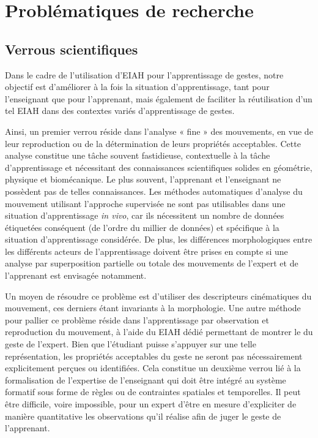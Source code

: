 \section{Problématiques de recherche}
\subsection{Verrous scientifiques}
Dans le cadre de l'utilisation d'EIAH pour l'apprentissage de gestes, notre objectif est d'améliorer à la fois la situation d'apprentissage, tant pour l'enseignant que pour l'apprenant, mais également de faciliter la réutilisation d'un tel EIAH dans des contextes variés d'apprentissage de gestes.

Ainsi, un premier verrou réside dans l'analyse « fine »  des mouvements, en vue de leur reproduction ou de la détermination de leurs propriétés acceptables. Cette analyse constitue une tâche souvent fastidieuse, contextuelle à la tâche d'apprentissage et nécessitant des connaissances scientifiques solides en géométrie, physique et biomécanique. Le plus souvent, l'apprenant et l'enseignant ne possèdent pas de telles connaissances. Les méthodes automatiques d'analyse du mouvement utilisant l'approche supervisée ne sont pas utilisables dans une situation d'apprentissage \textit{in vivo}, car ils nécessitent un nombre de données étiquetées conséquent (de l'ordre du millier de données) et spécifique à la situation d'apprentissage considérée. De plus, les différences morphologiques entre les différents acteurs de l'apprentissage doivent être prises en compte si une analyse par superposition partielle ou totale des mouvements de l'expert et de l'apprenant est envisagée notamment.

Un moyen de résoudre ce problème est d'utiliser des descripteurs cinématiques du mouvement, ces derniers étant invariants à la morphologie. Une autre méthode pour pallier ce problème réside dans l'apprentissage par observation et reproduction du mouvement, à l'aide du EIAH dédié permettant de montrer le du geste de l'expert. Bien que l'étudiant puisse s'appuyer sur une telle représentation, les propriétés acceptables du geste ne seront pas nécessairement explicitement perçues ou identifiées. Cela constitue un deuxième verrou lié à la formalisation de l'expertise de l'enseignant qui doit être intégré au système formatif sous forme de règles ou de contraintes spatiales et temporelles. Il peut être difficile, voire impossible, pour un expert d'être en mesure d'expliciter de manière quantitative les observations qu'il réalise afin de juger le geste de l'apprenant.

